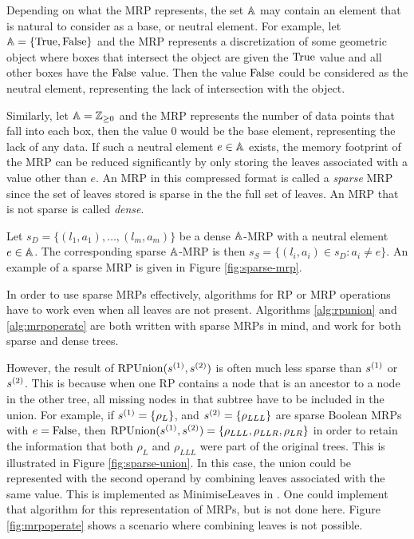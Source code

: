 \documentclass[../mrp.tex]{subfiles}
\begin{document}
  Depending on what the MRP represents, the set $\mathbb{A}$ may 
  contain an element that is natural to consider as a base, or neutral element.
  For example, let $\mathbb{A} = \{ \mathrm{True}, \mathrm{False} \}$ and the MRP represents a 
  discretization of some geometric object where boxes that
  intersect the object are given the $\mathrm{True}$ value and all other boxes have the $\mathrm{False}$ value.
  Then the value $\mathrm{False}$ could be considered as the neutral element, 
  representing the lack of intersection with the object.

  Similarly, let $\mathbb{A} = \mathbb{Z}_{\ge 0}$ and the MRP represents 
  the number of data points that fall into each box,
  then the value $0$ would be the base element, representing the lack of any data.
  If such a neutral element $e \in \mathbb{A}$ exists, 
  the memory footprint of the MRP can be reduced significantly by 
  only storing the leaves associated with a value other than $e$.
  An MRP in this compressed format is called a \textit{sparse} MRP since 
  the set of leaves stored is sparse in the the full set of leaves.
  An MRP that is not sparse is called \textit{dense}.

  Let $s_D = \{ (l_1, a_1),\dots,(l_m, a_m) \}$ be 
  a dense $\mathbb{A}$-MRP with a neutral element $e \in \mathbb{A}$.
  The corresponding sparse $\mathbb{A}$-MRP is then $s_S = \{ (l_i, a_i) \in s_D : a_i \neq e \}$.
  An example of a sparse MRP is given in Figure \ref{fig:sparse-mrp}.

  

  In order to use sparse MRPs effectively, 
  algorithms for RP or MRP operations have to work even when all leaves are not present.
  Algorithms \ref{alg:rpunion} and \ref{alg:mrpoperate} are both written with sparse MRPs in mind,
  and work for both sparse and dense trees.

  However, the result of $\mathrm{RPUnion}(s ^{(1)}, s ^{(2)})$ is often much less sparse than $s ^{(1)}$ or $s ^{(2)}$.
  This is because when one RP contains a node that is an ancestor to a node in the other tree, 
  all missing nodes in that subtree have to be included in the union.
  For example, if $s ^{(1)} = \{ \rho_L \}$, and 
  $s ^{(2)} = \{ \rho_{LLL} \}$ are sparse Boolean MRPs with $e = \mathrm{False}$, then 
  $\mathrm{RPUnion}(s ^{(1)}, s ^{(2)}) = \{ \rho_{LLL}, \rho_{LLR}, \rho_{LR} \}$ 
  in order to retain the information that 
  both $\rho_L$ and $\rho_{LLL}$ were part of the original trees.
  This is illustrated in Figure \ref{fig:sparse-union}.
  In this case, the union could be represented with the second operand
  by combining leaves associated with the same value.
  This is implemented as $\mathrm{MinimiseLeaves}$ in \cite{mrp-raaz-harlow-tucker}.
  One could implement that algorithm for this representation of MRPs, but is not done here.
  Figure \ref{fig:mrpoperate} shows a scenario where combining leaves is not possible.

  
  
\end{document}
